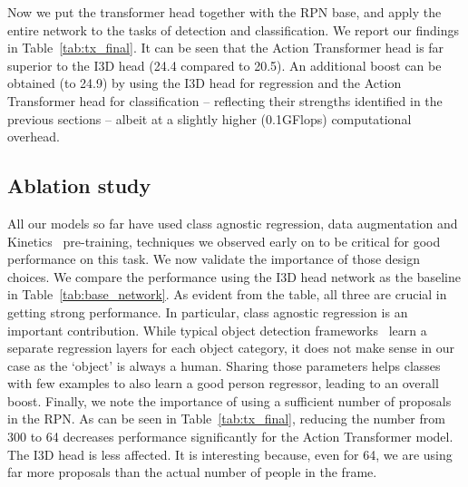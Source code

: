 \documentclass[10pt,twocolumn,letterpaper]{article}
\newcommand{\Tx}[0]{Action Transformer}
\begin{document}
Now we put the transformer head together with the RPN base, and apply the entire network
to the tasks  of detection and classification. We report our findings in
Table~\ref{tab:tx_final}. It can be seen that the \Tx{} head is far superior to the I3D head (24.4 compared to 20.5). An additional boost can be obtained (to 24.9) by using the I3D head for regression and the \Tx{} head for classification -- reflecting their strengths identified in the previous sections -- albeit at a slightly higher (0.1GFlops) computational overhead.




\subsection{Ablation study}\label{sec:exp:tx_ablate}



All our models so far have used class agnostic regression, data augmentation and Kinetics~\cite{kay2017kinetics} pre-training, techniques we observed early on to
be critical for good performance on this task.
We now validate the importance of those
design choices.
We compare the performance using the I3D head network as the baseline in Table~\ref{tab:base_network}. As evident from the table, all three are crucial in getting strong performance. In particular, class agnostic regression is an important
contribution. While typical object detection frameworks~\cite{he2017mask,huang2017speed} learn a separate regression layers for each object category, it does not make sense in our case as the `object' is always a human. Sharing those parameters helps classes with few examples to also learn a good person regressor, leading to an overall boost.
Finally, we note the importance of using a sufficient number of proposals in the RPN. As can be seen 
in
Table~\ref{tab:tx_final}, reducing the number from 
300 to 64 decreases performance significantly
for the  \Tx{} model. The I3D head is less affected. It is interesting because, even for 64, we are using far more proposals than the actual number of people in the frame.
\end{document}
